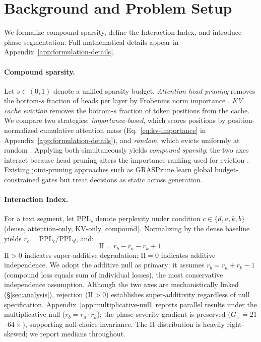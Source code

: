 
\section{Background and Problem Setup}
\label{sec:background}

We formalize compound sparsity, define the Interaction Index, and introduce phase segmentation. Full mathematical details appear in Appendix~\ref{app:formulation-details}.

\paragraph{Compound sparsity.}
Let $s \in (0,1)$ denote a unified sparsity budget. \emph{Attention head pruning} removes the bottom-$s$ fraction of heads per layer by Frobenius norm importance \cite{voita-acl2019, michel-neurips2019}. \emph{KV cache eviction} removes the bottom-$s$ fraction of token positions from the cache. We compare two strategies: \emph{importance-based}, which scores positions by position-normalized cumulative attention mass (Eq.~\ref{eq:kv-importance} in Appendix~\ref{app:formulation-details}), and \emph{random}, which evicts uniformly at random \cite{nacl-acl2024}. Applying both simultaneously yields \emph{compound sparsity}; the two axes interact because head pruning alters the importance ranking used for eviction \cite{spark-aaai2026}. Existing joint-pruning approaches such as GRASPrune \cite{graspune-acl2026} learn global budget-constrained gates but treat decisions as static across generation.

\paragraph{Interaction Index.}
For a text segment, let $\text{PPL}_c$ denote perplexity under condition $c \in \{d, a, k, b\}$ (dense, attention-only, KV-only, compound). Normalizing by the dense baseline yields $r_c = \text{PPL}_c / \text{PPL}_d$, and:
\begin{equation}
    \mathrm{II} = r_b - r_a - r_k + 1.
    \label{eq:ii}
\end{equation}
$\mathrm{II} > 0$ indicates super-additive degradation; $\mathrm{II} = 0$ indicates additive independence. We adopt the additive null as primary: it assumes $r_b = r_a + r_k - 1$ (compound loss equals sum of individual losses), the most conservative independence assumption. Although the two axes are mechanistically linked (\S\ref{sec:analysis}), rejection ($\mathrm{II} > 0$) establishes super-additivity regardless of null specification. Appendix~\ref{app:multiplicative-null} reports parallel results under the multiplicative null ($r_b = r_a \cdot r_k$); the phase-severity gradient is preserved ($G_{\times}{=}21$--$64{\times}$), supporting null-choice invariance. The II distribution is heavily right-skewed; we report medians throughout.

